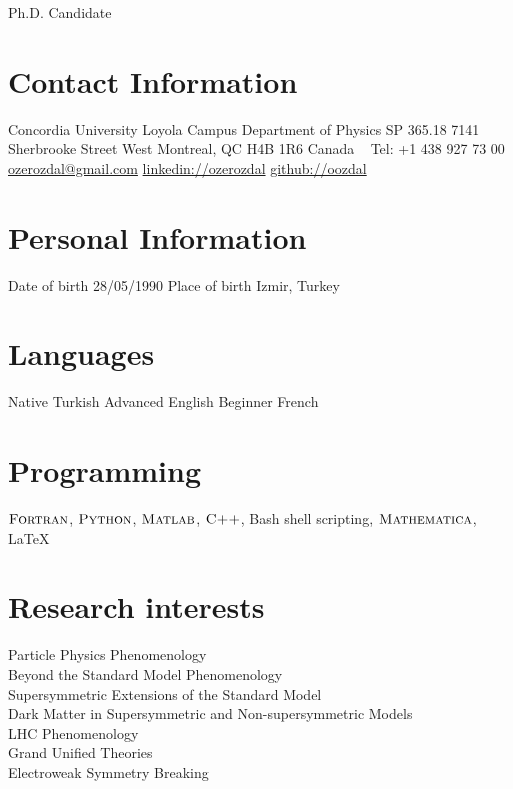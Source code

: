 \documentclass[]{friggeri-cv}
\begin{document}
       {Ph.D. Candidate}


\begin{aside}
  \section{Contact Information}
    Concordia University
    Loyola Campus
    Department of Physics SP 365.18
    7141 Sherbrooke Street West
    Montreal, QC  H4B 1R6
    Canada
    ~
    Tel: +1 438 927 73 00
    \href{mailto:ozerozdal@gmail.com}{ozerozdal@gmail.com}
    \href{http://www.linkedin.com/in/ozerozdal/}{linkedin://ozerozdal}
    \href{http://github.com/oozdal}{github://oozdal}
  \section{Personal Information}
  	Date of birth 28/05/1990
  	Place of birth
  	Izmir, Turkey
  \section{Languages}
    Native Turkish
    Advanced English 
    Beginner French
  \section{Programming}
    $\textsc{Fortran}$, $\textsc{Python}$, 
    $\textsc{Matlab}$, $\textsc{C++}$,
    Bash shell scripting,
    $\textsc{Mathematica}$, LaTeX
\end{aside}

\section{Research interests}

Particle Physics Phenomenology \\
Beyond the Standard Model Phenomenology \\
Supersymmetric Extensions of the Standard Model \\
Dark Matter in Supersymmetric and Non-supersymmetric Models \\
LHC Phenomenology \\
Grand Unified Theories \\
Electroweak Symmetry Breaking \\
\end{document}
